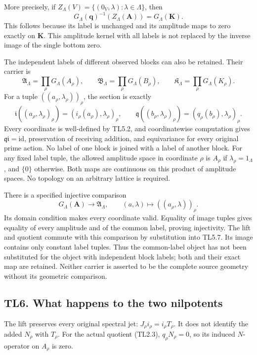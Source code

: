More precisely, if \(Z_\Lambda(V)=\{(0_V,\lambda):\lambda\in\Lambda\}\),
then \[
G_\Lambda(\mathbf q)^{-1}(Z_\Lambda(\mathbf A))
=G_\Lambda(\mathbf K).
\tag{TL5.5}
\] This follows because its label is unchanged and its amplitude maps to
zero exactly on \(\mathbf K\). This amplitude kernel with all labels is
not replaced by the inverse image of the single bottom zero.

The independent labels of different observed blocks can also be
retained. Their carrier is \[
\mathfrak A_\Lambda=\prod_\rho G_\Lambda(A_\rho),\qquad
\mathfrak B_\Lambda=\prod_\rho G_\Lambda(B_\rho),\qquad
\mathfrak K_\Lambda=\prod_\rho G_\Lambda(K_\rho).
\tag{TL5.6}
\] For a tuple \(((a_\rho,\lambda_\rho))_\rho\), the section is exactly
\[
\mathfrak i((a_\rho,\lambda_\rho)_\rho)
=(i_\rho(a_\rho),\lambda_\rho)_\rho,
\qquad
\mathfrak q((b_\rho,\lambda_\rho)_\rho)
=(q_\rho(b_\rho),\lambda_\rho)_\rho.
\tag{TL5.7}
\] Every coordinate is well-defined by TL5.2, and coordinatewise
computation gives \(\mathfrak q\mathfrak i=\mathrm{id}\), preservation
of receiving addition, and equivariance for every original prime action.
No label of one block is joined with a label of another block. For any
fixed label tuple, the allowed amplitude space in coordinate \(\rho\) is
\(A_\rho\) if \(\lambda_\rho=1_\Lambda\), and \(\{0\}\) otherwise. Both
maps are continuous on this product of amplitude spaces. No topology on
an arbitrary lattice is required.

There is a specified injective comparison \[
G_\Lambda(\mathbf A)\longrightarrow\mathfrak A_\Lambda,
\qquad (a,\lambda)\longmapsto((a_\rho,\lambda))_\rho.
\tag{TL5.8}
\] Its domain condition makes every coordinate valid. Equality of image
tuples gives equality of every amplitude and of the common label,
proving injectivity. The lift and quotient commute with this comparison
by substitution into TL5.7. Its image contains only constant label
tuples. Thus the common-label object has not been substituted for the
object with independent block labels; both and their exact map are
retained. Neither carrier is asserted to be the complete source geometry
without its geometric comparison.

\subsection{TL6. What happens to the two
nilpotents}\label{tl6.-what-happens-to-the-two-nilpotents}

The lift preserves every original spectral jet:
\(J_\rho i_\rho=i_\rho T_\rho\). It does not identify the added
\(N_\rho\) with \(T_\rho\). For the actual quotient (TL2.3),
\(q_\rho N_\rho=0\), so its induced \(N\)-operator on \(A_\rho\) is
zero.

